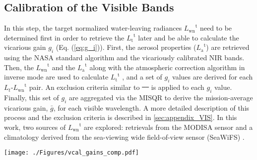 \documentclass[]{interact}
\theoremstyle{plain}%
\theoremstyle{definition}
\theoremstyle{remark}
\providecommand{\DIFaddtex}[1]{{\protect\color{blue}\uwave{#1}}} %
\providecommand{\DIFdeltex}[1]{{\protect\color{red}\sout{#1}}}                      %
\providecommand{\DIFaddbegin}{} %
\providecommand{\DIFaddend}{} %
\providecommand{\DIFdelbegin}{} %
\providecommand{\DIFdelend}{} %
\providecommand{\DIFaddFL}[1]{\DIFadd{#1}} %
\providecommand{\DIFdelFL}[1]{\DIFdel{#1}} %
\providecommand{\DIFaddbeginFL}{} %
\providecommand{\DIFaddendFL}{} %
\providecommand{\DIFdelbeginFL}{} %
\providecommand{\DIFdelendFL}{} %
\providecommand{\DIFadd}[1]{\texorpdfstring{\DIFaddtex{#1}}{#1}} %
\providecommand{\DIFdel}[1]{\texorpdfstring{\DIFdeltex{#1}}{}} %
\newcommand{\DIFscaledelfig}{0.5}
\newlength{\DIFdelgraphicswidth} %
\newlength{\DIFdelgraphicsheight} %
\newcommand{\DIFaddincludegraphics}[2][]{{\color{blue}\fbox{\DIFOincludegraphics[#1]{#2}}}} %
\newcommand{\DIFdelincludegraphics}[2][]{%
\sbox{\DIFdelgraphicsbox}{\DIFOincludegraphics[#1]{#2}}%
\settoboxwidth{\DIFdelgraphicswidth}{\DIFdelgraphicsbox} %
\settoboxtotalheight{\DIFdelgraphicsheight}{\DIFdelgraphicsbox} %
\scalebox{\DIFscaledelfig}{%
\parbox[b]{\DIFdelgraphicswidth}{\usebox{\DIFdelgraphicsbox}\\[-\baselineskip] \rule{\DIFdelgraphicswidth}{0em}}\llap{\resizebox{\DIFdelgraphicswidth}{\DIFdelgraphicsheight}{%
\setlength{\unitlength}{\DIFdelgraphicswidth}%
\begin{picture}(1,1)%
\thicklines\linethickness{2pt} %
{\color[rgb]{1,0,0}\put(0,0){\framebox(1,1){}}}%
{\color[rgb]{1,0,0}\put(0,0){\line( 1,1){1}}}%
{\color[rgb]{1,0,0}\put(0,1){\line(1,-1){1}}}%
\end{picture}%
}\hspace*{3pt}}} %
} %
\DeclareRobustCommand{\DIFaddbegin}{\DIFOaddbegin \let\includegraphics\DIFaddincludegraphics} %
\DeclareRobustCommand{\DIFaddend}{\DIFOaddend \let\includegraphics\DIFOincludegraphics} %
\DeclareRobustCommand{\DIFdelbegin}{\DIFOdelbegin \let\includegraphics\DIFdelincludegraphics} %
\DeclareRobustCommand{\DIFdelend}{\DIFOaddend \let\includegraphics\DIFOincludegraphics} %
\DeclareRobustCommand{\DIFaddbeginFL}{\DIFOaddbeginFL \let\includegraphics\DIFaddincludegraphics} %
\DeclareRobustCommand{\DIFaddendFL}{\DIFOaddendFL \let\includegraphics\DIFOincludegraphics} %
\DeclareRobustCommand{\DIFdelbeginFL}{\DIFOdelbeginFL \let\includegraphics\DIFdelincludegraphics} %
\DeclareRobustCommand{\DIFdelendFL}{\DIFOaddendFL \let\includegraphics\DIFOincludegraphics} %
\begin{document}
\subsection{Calibration of the Visible Bands}
\label{sec:vcal_vis}
In this step, the target normalized water-leaving radiances ${L_\text{wn}}^\text{t}$ need to be determined first in order to retrieve the  ${L_\text{t}}^\text{t}$ later and be able to calculate the vicarious gain $g_i$ (Eq. (\ref{eq:g_i})). First, the aerosol properties (${L_\text{a}}^\text{t}$) are retrieved using the NASA standard algorithm \citep{Mobley2016} and the vicariously calibrated NIR bands. Then, the ${L_\text{wn}}^\text{t}$ and the ${L_\text{a}}^\text{t}$ along with the atmospheric correction algorithm in inverse mode are used to calculate ${L_\text{t}}^\text{t}$ \citep{Franz:07}, and a set of $g_i$ values are derived for each $L_t$-${L_\text{wn}}^\text{t}$ pair. An exclusion criteria similar to \DIFdelbegin \DIFdel{\mbox{%
\citep{Bailey2006} }%
}\DIFdelend \DIFaddbegin \DIFadd{\mbox{%
\cite{Bailey2006} }%
}\DIFaddend is applied to each $g_i$ value. Finally, this set of $g_i$ are aggregated via the MISQR to derive the mission-average vicarious gain, $\bar{g}$, for each visible wavelength. A more detailed description of this process and the exclusion criteria is described in \autoref{sec:appendix_VIS}. In this work, two sources of ${L_\text{wn}}^\text{t}$ are explored: retrievals from the MODISA sensor and a climatology derived from the sea-viewing wide field-of-view sensor (SeaWiFS) \citep{McClain2004}. 

\begin{table}[htbp!]
\caption{GOCI $\bar{g}$ and standard deviations (in parentheses) calculated using the ${L_\text{wn}}^\text{t}$ from MODISA and SeaWIFS climatology. The vicarious gains derived by \DIFdelbeginFL \DIFdelFL{Wang }%
\DIFdelFL{et}%
\DIFdelFL{al. (2013) \mbox{%
\citep{Wang:13}}%
}\DIFdelendFL \DIFaddbeginFL \DIFaddFL{\mbox{%
\cite{Wang:13}}%
}\DIFaddendFL , \DIFdelbeginFL \DIFdelFL{Ahn }%
\DIFdelFL{et}%
\DIFdelFL{al. (2015) \mbox{%
\citep{Ahn2015}}%
}\DIFdelendFL \DIFaddbeginFL \DIFaddFL{\mbox{%
\cite{Ahn2015}}%
}\DIFaddendFL , and the current gains used in SeaDAS were included for comparison. \label{tab:vcal_gains_comp}}

  \centering
    \texttt{[image: ./Figures/vcal\_gains\_comp.pdf]}

\end{table}
\end{document}
